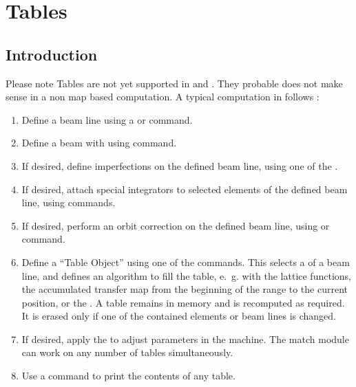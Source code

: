 \chapter{Tables}
\label{chp:tables}

\section{Introduction}
\label{sec:tabintro}

Please note Tables are not yet supported in \noopalt and \noopalcycl . They probable does not make sense in a non map based computation.  A typical computation in \opal  follows :

\begin{enumerate}
\item
  Define a beam line using a 
  or  command.
\item
  Define a beam with using  command.
\item
  If desired, define imperfections on the defined beam line,
  using one of the .
\item
  If desired, attach special integrators to selected elements of the
  defined beam line,
  using  commands.
\item
  If desired, perform an orbit correction on the defined beam line,
  using  or
   command.
\item
  Define a ``Table Object'' using one of the  commands. 
  This selects a  of a beam line,
  and defines an algorithm to fill the table,
  e.~g. with the lattice functions, 
  the accumulated transfer map from the beginning of the range to the
  current position, or the .
  A table remains in memory and is recomputed as required.
  It is erased only if one of the contained elements or beam lines is changed. 
\item
  If desired, apply the  to adjust parameters
  in the machine. The match module can work on any number of tables
  simultaneously. 
\item
  Use a  command to print the contents of any
  table. 
\end{enumerate}

